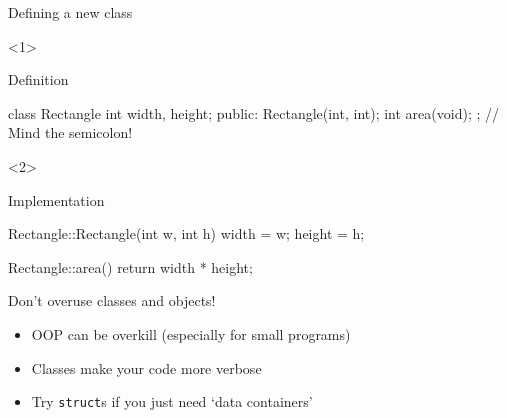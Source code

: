 \begin{frame}[fragile]{Defining a new class}
    \begin{onlyenv}<1>
        \begin{block}{Definition}
            \begin{cpp}
                class Rectangle {
                    int width, height;
                    public:
                        Rectangle(int, int);
                        int area(void);
                }; // Mind the semicolon!
            \end{cpp}
        \end{block}
    \end{onlyenv}
    \begin{onlyenv}<2>
        \begin{block}{Implementation}
            \begin{cpp}
                Rectangle::Rectangle(int w, int h) {
                    width = w;
                    height = h;
                }

                Rectangle::area() {
                    return width * height;
                }
            \end{cpp}
        \end{block}
    \end{onlyenv}
\end{frame}

\begin{frame}[fragile]{Don't overuse classes and objects!}
    \begin{itemize}
        \item OOP can be overkill (especially for small programs)
        \item Classes make your code more verbose
        \item Try \texttt{struct}s if you just need `data containers'
    \end{itemize}
\end{frame}



